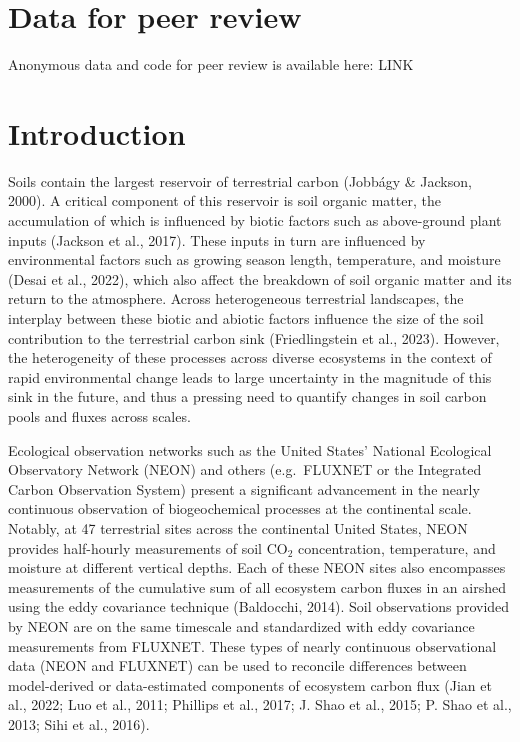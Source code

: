 \documentclass[
  letterpaper,
  DIV=11,
  numbers=noendperiod]{scrartcl}
\begin{document}
\section{Data for peer review}\label{data-for-peer-review}

Anonymous data and code for peer review is available here: LINK

\section{Introduction}\label{introduction}

Soils contain the largest reservoir of terrestrial carbon (Jobbágy \&
Jackson, 2000). A critical component of this reservoir is soil organic
matter, the accumulation of which is influenced by biotic factors such
as above-ground plant inputs (Jackson et al., 2017). These inputs in
turn are influenced by environmental factors such as growing season
length, temperature, and moisture (Desai et al., 2022), which also
affect the breakdown of soil organic matter and its return to the
atmosphere. Across heterogeneous terrestrial landscapes, the interplay
between these biotic and abiotic factors influence the size of the soil
contribution to the terrestrial carbon sink (Friedlingstein et al.,
2023). However, the heterogeneity of these processes across diverse
ecosystems in the context of rapid environmental change leads to large
uncertainty in the magnitude of this sink in the future, and thus a
pressing need to quantify changes in soil carbon pools and fluxes across
scales.

Ecological observation networks such as the United States' National
Ecological Observatory Network (NEON) and others (e.g.~FLUXNET or the
Integrated Carbon Observation System) present a significant advancement
in the nearly continuous observation of biogeochemical processes at the
continental scale. Notably, at 47 terrestrial sites across the
continental United States, NEON provides half-hourly measurements of
soil CO\(_{2}\) concentration, temperature, and moisture at different
vertical depths. Each of these NEON sites also encompasses measurements
of the cumulative sum of all ecosystem carbon fluxes in an airshed using
the eddy covariance technique (Baldocchi, 2014). Soil observations
provided by NEON are on the same timescale and standardized with eddy
covariance measurements from FLUXNET. These types of nearly continuous
observational data (NEON and FLUXNET) can be used to reconcile
differences between model-derived or data-estimated components of
ecosystem carbon flux (Jian et al., 2022; Luo et al., 2011; Phillips et
al., 2017; J. Shao et al., 2015; P. Shao et al., 2013; Sihi et al.,
2016).
\end{document}
